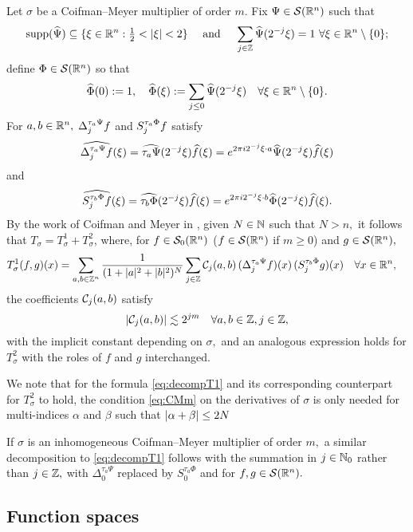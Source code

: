 {Let $\sigma$ be a Coifman--Meyer multiplier of order $m.$
Fix $\Psi \in {\mathcal{S}}({{\mathbb R}^n})$ such that 
$$
{\rm{supp}}(\widehat{\Psi}) \subseteq \{ \xi \in {{\mathbb R}^n} : {\textstyle \frac{1}{2}} < |\xi| < 2 \} \quad\text{ and }\quad
\sum_{j\in\mathbb{Z}} \widehat{\Psi}(2^{-j}\xi) = 1 \,\,\forall \xi \in {{\mathbb R}^n} \setminus \{ 0 \};
$$
define $\Phi \in {\mathcal{S}}({{\mathbb R}^n})$ so that
$$
\widehat{\Phi}(0) := 1,\quad \widehat{\Phi}(\xi) := \sum_{j \le 0} \widehat{\Psi}(2^{-j}\xi)\quad \forall \xi \in {{\mathbb R}^n} \setminus \{0\}.$$
For $a,b\in{{\mathbb R}^n},$ $\Delta^{\tau_a \Psi }_{j} f$ and  $S^{ \tau_a \Phi }_{j} f$ satisfy 
$$\widehat{\Delta^{\tau_a \Psi }_{j} f}(\xi)=\widehat{\tau_a\Psi}(2^{-j}\xi)\widehat{f}(\xi)=e^{2\pi i 2^{-j}\xi\cdot a} \widehat{\Psi}(2^{-j}\xi)\widehat{f}(\xi)$$
 and   
 $$\widehat{S^{\tau_b \Phi }_{j} f}(\xi)=\widehat{\tau_b\Phi}(2^{-j}\xi)\widehat{f}(\xi)=e^{2\pi i 2^{-j}\xi\cdot b} \widehat{\Phi}(2^{-j}\xi)\widehat{f}(\xi).$$
By the work of Coifman and Meyer in \cite{MR518170},  given $N\in \mathbb{N}$ such that $N>n,$ it follows that $T_\sigma= T_\sigma^1 + T_\sigma^2$, where, for  $f\in {\mathcal{S}_0}({{\mathbb R}^n})$ ($f\in {\mathcal{S}}({{\mathbb R}^n})$ if $m\ge 0$) and $g\in{\mathcal{S}}({{\mathbb R}^n}),$
\begin{align}\label{eq:decompT1}
T_\sigma^1(f,g)(x) &= \sum_{a,b\in \mathbb{Z}^n} \frac{1}{(1+|a|^2+|b|^2)^N} \sum_{j\in\mathbb{Z}} \mathcal{C}_j(a,b) \,(\Delta^{ \tau_a \Psi }_{j} f)(x)\, (S^{ \tau_b \Phi }_{j} g )(x)\quad \forall x\in {{\mathbb R}^n},
\end{align}
 the coefficients $\mathcal{C}_j(a,b)$   satisfy
\begin{equation}\label{eq:cjbound}
\left\vert \mathcal{C}_j(a,b) \right\vert\lesssim 2^{jm}\quad \forall a,b\in\mathbb{Z}, j\in \mathbb{Z},
\end{equation}
with the implicit constant depending on $\sigma,$ and an analogous expression holds for $T_\sigma^2$ with the roles of $f$ and $g$ interchanged. 

We note that for the formula \eqref{eq:decompT1} and its corresponding counterpart for $T^2_\sigma$ to hold, the condition \eqref{eq:CMm} on the derivatives of $\sigma$ is only needed for multi-indices $\alpha$ and $\beta$ such that  $\left\vert \alpha+\beta \right\vert\le 2N$

If $\sigma$ is an inhomogeneous Coifman--Meyer multiplier of order $m,$ a similar decomposition to \eqref{eq:decompT1} follows  with the summation in $j\in\mathbb{N}_0$ rather than $j\in\mathbb{Z},$  with  $\Delta_0^{\tau_a \Psi}$ replaced by $S_0^{\tau_a\Phi}$ and for $f,g\in {\mathcal{S}}({{\mathbb R}^n}).$




\subsection{Function spaces}

}
